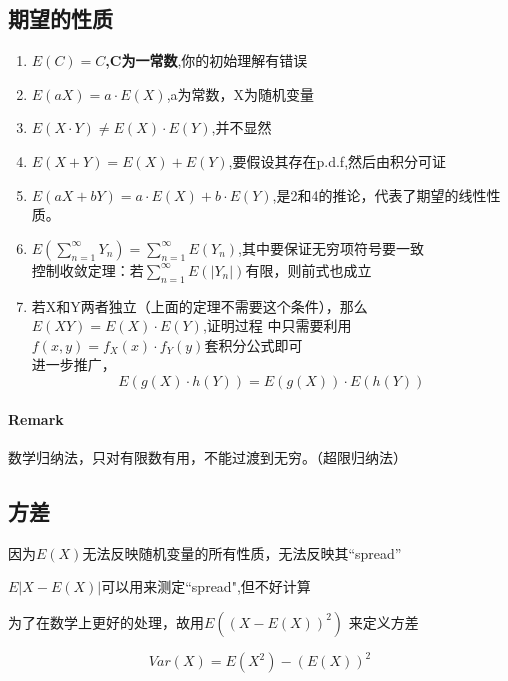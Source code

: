 \documentclass[12pt,a4paper]{ctexart}
\begin{document}
\subsection{期望的性质}
\begin{enumerate}
\item \textbf{$ E \left(C\right)=C $,C为一常数},你的初始理解有错误
\item $ E \left(a X\right)=a \cdot E \left(X\right) $,a为常数，X为随机变量
\item $ E \left(X \cdot Y\right) \neq E \left(X\right) \cdot E \left(Y\right) $,并不显然
\item $ E \left(X+Y\right)=E \left(X\right)+E \left(Y\right) $,要假设其存在p.d.f,然后由积分可证
\item $ E \left(aX+bY\right)=a \cdot E \left(X\right)+b \cdot E 
\left(Y\right) $,是2和4的推论，代表了期望的线性性质。
\item $ E \left( \sum_{n=1}^{\infty} Y_n\right)= \sum_{n=1}^{\infty}  E \left(Y_n\right)$,其中要保证无穷项符号要一致\\
控制收敛定理：若$ \sum_{n=1}^{\infty} E \left(\left|Y_n \right|\right) $有限，则前式也成立
\item 若X和Y两者独立（上面的定理不需要这个条件），那么$ E \left(XY\right)=E \left(X\right) \cdot E \left(Y\right) $,证明过程
中只需要利用$ f \left(x,y\right)=f_X \left(x\right) \cdot f_Y \left(y\right) $套积分公式即可\\
进一步推广，\[ E \left(g \left(X\right) \cdot h \left(Y\right)\right)
=E \left(g \left(X\right)\right) \cdot E \left(h \left(Y\right)\right) \]
\end{enumerate}

\paragraph{Remark }数学归纳法，只对有限数有用，不能过渡到无穷。（超限归纳法）

\subsection{方差}
因为$ E \left(X\right) $无法反映随机变量的所有性质，无法反映其“spread”

$ E \left|X-E \left(X\right)\right| $可以用来测定“spread",但不好计算

为了在数学上更好的处理，故用$ E \left(\left(X-E \left(X\right)\right)^2\right) $
来定义方差

\[ Var \left(X\right)=E \left(X^2\right) -\left(E \left(
X\right)\right)^2 \]
\end{document}
